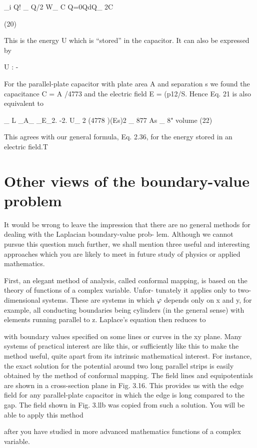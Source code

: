 _i Q! _ Q/2
W_ C Q=0QdQ_ 2C

(20)

This is the energy U which is ``stored'' in the capacitor. It can also
be expressed by

U : -%

For the parallel-plate capacitor with plate area A and separation s
we found the capacitance C = A /4773 and the electric field E = (p12/S.
Hence Eq. 21 is also equivalent to

_ L _A_ _E_2. -2.
U_ 2 (4778 )(Es)2 _ 877 As _ 8" volume (22)

This agrees with our general formula, Eq. 2.36, for the energy stored
in an electric field.T

\section{Other views of the boundary-value problem}

It would be wrong to leave the impression that there are no general
methods for dealing with the Laplacian boundary-value prob-
lem. Although we cannot pursue this question much further, we
shall mention three useful and interesting approaches which you are
likely to meet in future study of physics or applied mathematics.

First, an elegant method of analysis, called conformal mapping,
is based on the theory of functions of a complex variable. Unfor-
tunately it applies only to two-dimensional systems. These are systems
in which $\varphi$ depends only on x and y, for example, all conducting
boundaries being cylinders (in the general sense) with elements
running parallel to z. Laplace's equation then reduces to

with boundary values specified on some lines or curves in the xy
plane. Many systems of practical interest are like this, or sufficiently
like this to make the method useful, quite apart from its intrinsic
mathematical interest. For instance, the exact solution for the potential
around two long parallel strips is easily obtained by the
method of conformal mapping. The field lines and equipotentials
are shown in a cross-section plane in Fig. 3.16. This provides us
with the edge field for any parallel-plate capacitor in which the edge
is long compared to the gap. The field shown in Fig. 3.llb was
copied from such a solution. You will be able to apply this method

after you have studied in more advanced mathematics functions of
a complex variable.

